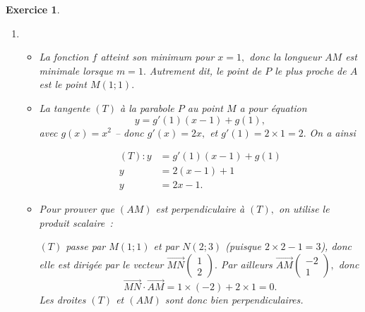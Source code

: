\documentclass[10pt]{article}
\newtheorem{exo}{Exercice}
\begin{document}
\begin{exo}
\begin{enumerate}
\item

\begin{itemize}
\item[\textbullet] La fonction $f$ atteint son minimum pour $x=1,$ donc la longueur $AM$ est minimale lorsque $m=1.$ Autrement dit, le point de $P$ le plus proche de $A$ est le point $M(1;1).$

\item[\textbullet] La tangente $(T)$ à la parabole $P$ au point $M$ a pour équation
\[y=g'(1)(x-1)+g(1),\]
avec $g(x)=x^2$ -- donc $g'(x)=2x,$ et $g'(1)=2\times 1=2.$ On a ainsi

\begin{align*}
(T):y&=g'(1)(x-1)+g(1)\\
y&=2(x-1)+1\\
y&=2x-1.
\end{align*}
\item[\textbullet] Pour prouver que $(AM)$ est perpendiculaire à $(T),$ on utilise le produit scalaire~:


$(T)$ passe par $M(1;1)$ et par $N(2;3)$ (puisque $2\times 2-1=3$), donc elle est dirigée par le vecteur $\overrightarrow{MN}\begin{pmatrix}1\\2\end{pmatrix}.$ Par ailleurs $\overrightarrow{AM}\begin{pmatrix}-2\\1\end{pmatrix},$ donc
\[\overrightarrow{MN}\cdot \overrightarrow{AM}=1\times (-2)+2\times 1=0.\] Les droites $(T)$ et $(AM)$ sont donc bien perpendiculaires.
\end{itemize}



\end{enumerate}
\end{exo}
\end{document}
